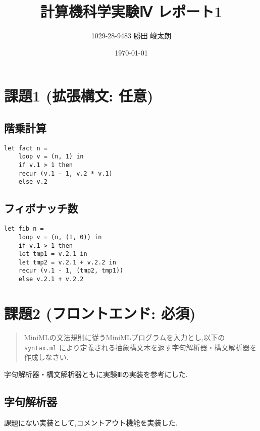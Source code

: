 



\title{計算機科学実験Ⅳ レポート1}
\author{1029-28-9483 勝田 峻太朗}
\date{\today}
\maketitle

\section*{課題1 (拡張構文: 任意)}

\subsection*{階乗計算}

\begin{lstlisting}[caption=階乗計算]
    let fact n =
    loop v = (n, 1) in
    if v.1 > 1 then
    recur (v.1 - 1, v.2 * v.1)
    else v.2
\end{lstlisting}

\subsection*{フィボナッチ数}

\begin{lstlisting}[caption=フィボナッチ数の計算]
    let fib n = 
    loop v = (n, (1, 0)) in
    if v.1 > 1 then 
    let tmp1 = v.2.1 in
    let tmp2 = v.2.1 + v.2.2 in
    recur (v.1 - 1, (tmp2, tmp1))
    else v.2.1 + v.2.2
\end{lstlisting}

\section*{課題2 (フロントエンド: 必須)}

\begin{quotation}
MiniMLの文法規則に従うMiniMLプログラムを入力とし,以下の \lstinline{syntax.ml} により定義される抽象構文木を返す字句解析器・構文解析器を作成しなさい.
\end{quotation}

字句解析器・構文解析器ともに実験Ⅲの実装を参考にした.

\subsection*{字句解析器}

課題にない実装として,コメントアウト機能を実装した.

